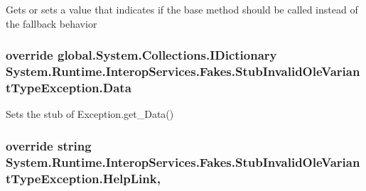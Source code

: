 Gets or sets a value that indicates if the base method should be called instead of the fallback behavior

\hypertarget{class_system_1_1_runtime_1_1_interop_services_1_1_fakes_1_1_stub_invalid_ole_variant_type_exception_a093a52190a5bd0dea37fbc83af2ce297}{
\subsubsection[{Data}]{\setlength{\rightskip}{0pt plus 5cm}override global.\-System.\-Collections.\-I\-Dictionary System.\-Runtime.\-Interop\-Services.\-Fakes.\-Stub\-Invalid\-Ole\-Variant\-Type\-Exception.\-Data\hspace{0.3cm}{\ttfamily [get]}}}\label{class_system_1_1_runtime_1_1_interop_services_1_1_fakes_1_1_stub_invalid_ole_variant_type_exception_a093a52190a5bd0dea37fbc83af2ce297}


Sets the stub of Exception.\-get\-\_\-\-Data()

\hypertarget{class_system_1_1_runtime_1_1_interop_services_1_1_fakes_1_1_stub_invalid_ole_variant_type_exception_a69b9512ec5625ab345c28ee2eac6cfad}{
\subsubsection[{Help\-Link}]{\setlength{\rightskip}{0pt plus 5cm}override string System.\-Runtime.\-Interop\-Services.\-Fakes.\-Stub\-Invalid\-Ole\-Variant\-Type\-Exception.\-Help\-Link\hspace{0.3cm}{\ttfamily [get]}, {\ttfamily [set]}}}\label{class_system_1_1_runtime_1_1_interop_services_1_1_fakes_1_1_stub_invalid_ole_variant_type_exception_a69b9512ec5625ab345c28ee2eac6cfad}


